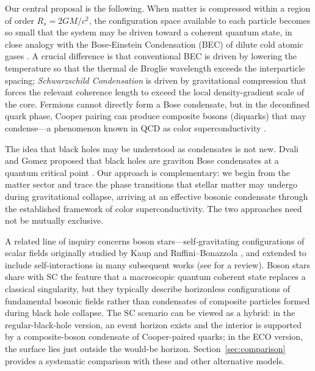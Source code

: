 \documentclass[epj]{svjour}
\begin{document}
Our central proposal is the following. When matter is compressed within a region of order $R_s = 2GM/c^2$, the configuration space available to each particle becomes so small that the system may be driven toward a coherent quantum state, in close analogy with the Bose-Einstein Condensation (BEC) of dilute cold atomic gases \cite{PethickSmith2008,Stringari2003,Dalfovo1999}. A crucial difference is that conventional BEC is driven by lowering the temperature so that the thermal de Broglie wavelength exceeds the interparticle spacing; \emph{Schwarzschild Condensation} is driven by gravitational compression that forces the relevant coherence length to exceed the local density-gradient scale of the core. Fermions cannot directly form a Bose condensate, but in the deconfined quark phase, Cooper pairing can produce composite bosons (diquarks) that may condense---a phenomenon known in QCD as color superconductivity \cite{Alford2008}.

The idea that black holes may be understood as condensates is not new. Dvali and Gomez proposed that black holes are graviton Bose condensates at a quantum critical point \cite{DvaliGomez2013}. Our approach is complementary: we begin from the matter sector and trace the phase transitions that stellar matter may undergo during gravitational collapse, arriving at an effective bosonic condensate through the established framework of color superconductivity. The two approaches need not be mutually exclusive.

A related line of inquiry concerns boson stars---self-gravitating configurations of scalar fields originally studied by Kaup \cite{Kaup1968} and Ruffini--Bonazzola \cite{Ruffini1969}, and extended to include self-interactions in many subsequent works (see \cite{LieblingPalenzuela2017} for a review). Boson stars share with SC the feature that a macroscopic quantum coherent state replaces a classical singularity, but they typically describe horizonless configurations of fundamental bosonic fields rather than condensates of composite particles formed during black hole collapse. The SC scenario can be viewed as a hybrid: in the regular-black-hole version, an event horizon exists and the interior is supported by a composite-boson condensate of Cooper-paired quarks; in the ECO version, the surface lies just outside the would-be horizon. Section~\ref{sec:comparison} provides a systematic comparison with these and other alternative models.
\end{document}
